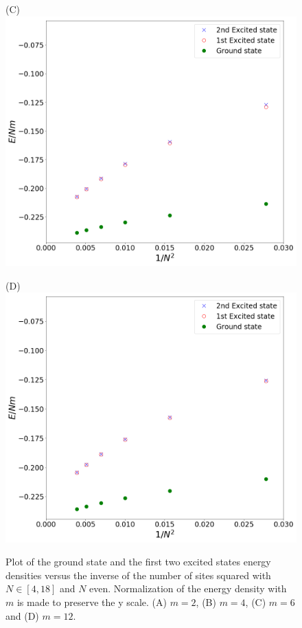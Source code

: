 \begin{figure}
\begin{minipage}{.5\textwidth}
		\centering(C)
		\includegraphics[scale=0.18]{figures/ExcitedStatesEven_m8_N-2.png}
	\end{minipage}%
	\begin{minipage}{0.5\textwidth}
		\centering(D)
		\includegraphics[scale=0.18]{figures/ExcitedStatesEven_m15_N-2.png}
	\end{minipage}
	\caption{Plot of the ground state and the first two excited states energy densities versus the inverse of the number of sites squared with $N\in[4,18]$ and $N$ even. Normalization of the energy density with $m$ is made to preserve the y scale. (A) $m=2$, (B) $m=4$, (C) $m=6$ and (D) $m=12$.}\label{fig:ExStMassive}
\end{figure}

